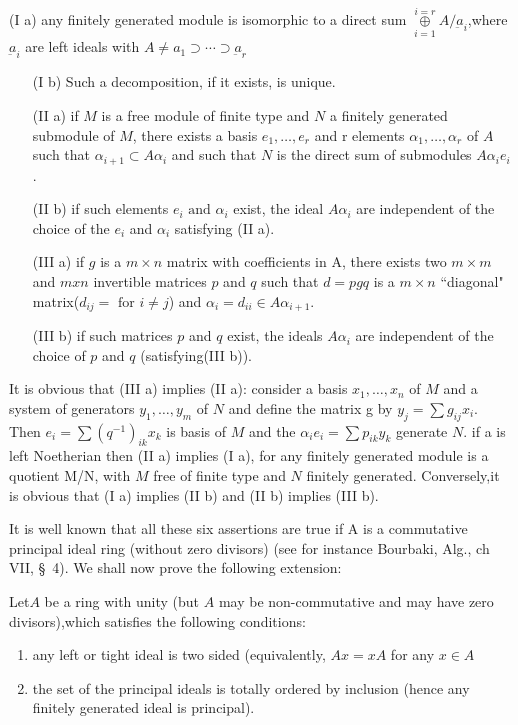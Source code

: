 (I a) any finitely generated module is isomorphic to a direct sum
$\overset{i=r}{\underset{i=1}{\oplus}} A/ \underbar{a}_i$,\pageoriginale where
$\underbar{a}_i$ are left ideals with $A \neq {a}_1 \supset
\cdots \supset \underbar{a}_r$ 
\begin{enumerate}
\item[(I b)] Such a decomposition, if it exists, is unique.

\item[(II a)] if $M$ is a free module of finite type and $N$ a finitely
  generated submodule of $M$, there exists a basis $e_1, \ldots,e_r$
  and r elements $\alpha_1, \ldots,\alpha_r$ of $A$ such that
  $\alpha_{i+1} \subset A \alpha_i$ and such that $N$ is the direct sum
  of submodules $A \alpha_i e_i$. 

\item[(II b)] if such elements $e_i \text{ and } \alpha_i$ exist, the ideal
  $A\alpha_i$ are independent of the choice of the $e_i$  and
  $\alpha_i$ satisfying (II a).   

\item[(III a)] if $g$ is a $m \times n$ matrix with coefficients in A,
  there exists 
  two $m \times m$ and $m x n$ invertible matrices $p$ and $q$ such that
  $d=pgq$ is a $m \times n$ ``diagonal" matrix(\iec  $d_{ij}= \text{ for } i
  \neq j$) and $\alpha_i = d_{ii}\in A \alpha_{i+1}$. 

\item[(III b)] if such matrices $p$ and $q$  exist, the ideals $A \alpha_i$ are
  independent of the choice of $p$ and $q$ (satisfying(III b)). 
\end{enumerate}
It is obvious that (III a) implies (II a): consider a basis $x_1,
\ldots, x_n$ of $M$ and a system of generators $y_1, \ldots,y_m$ of
$N$ and define the matrix g by $y_j = \sum g_{ij} x_i$. Then $e_i =
\sum (q^{-1})_{ik}x_k$ is basis of $M$ and the $\alpha_i e_i = \sum
p_{ik}y_k$ generate $N$. if a is left Noetherian then (II a) implies
(I a), for any finitely generated module is a quotient M/N, with $M$
free of finite type and $N$ finitely generated. Conversely,it is
obvious that (I a) implies (II b) and (II b) implies (III b). 

It is well known that all these six assertions are true if A is a
commutative principal ideal ring (without zero divisors) (see for
instance Bourbaki, Alg., ch VII, \S\ 4). We shall now prove the following
extension: 

\begin{theorem*}
  Let\pageoriginale $A$ be a ring with unity (but $A$ may be non-commutative and
    may have zero divisors),which satisfies the following conditions: 
  \begin{enumerate}[\rm 1)]
  \item any left or tight ideal is two sided (equivalently, $Ax
    =xA$ for any $x \in A$ 
  \item the set of the principal ideals is totally ordered by
    inclusion (hence any finitely generated ideal is principal). 
  \end{enumerate}
\end{theorem*}

